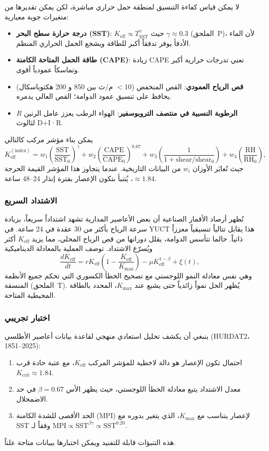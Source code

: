 \documentclass[11pt,a4paper]{article}
\newcommand{\Keff}{K_{\mathrm{eff}}}
\begin{document}
	لا يمكن قياس كفاءة التنسيق لمنطقة حمل حراري مباشرة، لكن يمكن تقديرها من متغيرات جوية معيارية:
	\begin{itemize}
		\item \textbf{درجة حرارة سطح البحر (SST)}: \(K_{\mathrm{eff}} \propto T_{\mathrm{SST}}^{\gamma}\) حيث \(\gamma \approx 0.3\) (الملحق~P)، لأن الماء الأدفأ يوفر تدفقاً أكبر للطاقة ويشجع الحمل الحراري المنظم.
		\item \textbf{طاقة الحمل المتاحة الكامنة (CAPE)}: زيادة CAPE تعني تدرجات حرارية أكبر وتماسكاً عمودياً أقوى.
		\item \textbf{قص الرياح العمودي}: القص المنخفض (\(< 10\) م/ث بين 850 و 200 هكتوباسكال) يحافظ على تنسيق عمود الدوامة؛ القص العالي يدمره.
		\item \textbf{الرطوبة النسبية في منتصف التروبوسفير}: الهواء الرطب يعزز عامل الرنين \(R\) لثالوث D+I·R.
	\end{itemize}
	يمكن بناء مؤشر مركب كالتالي
	\[
	\Keff^{\mathrm{(index)}} = w_1 \left( \frac{\mathrm{SST}}{\mathrm{SST}_0} \right)^{\gamma}
	+ w_2 \left( \frac{\mathrm{CAPE}}{\mathrm{CAPE}_0} \right)^{0.67}
	+ w_3 \left( \frac{1}{1 + \mathrm{shear}/\mathrm{shear}_0} \right)
	+ w_4 \left( \frac{\mathrm{RH}}{\mathrm{RH}_0} \right),
	\]
	حيث تُعايَر الأوزان \(w_i\) من البيانات التاريخية. عندما يتجاوز هذا المؤشر القيمة الحرجة \(\approx 1.84\)، يُتنبأ بتكون الإعصار بفترة إنذار 24--48 ساعة.
	
	\subsubsection*{الاشتداد السريع}
	
	تُظهر أرصاد الأقمار الصناعية أن بعض الأعاصير المدارية تشهد اشتداداً سريعاً، بزيادة سرعة الرياح بأكثر من 30 عقدة في 24 ساعة. في YUCT هذا يقابل تتالياً تنسيقياً معززاً ذاتياً. حالما تتأسس الدوامة، يقلل دورانها من قص الرياح المحلي، مما يزيد \(\Keff\) أكثر ويُسرّع الاشتداد. توصف العملية بالمعادلة الديناميكية
	\[
	\frac{d\Keff}{dt} = r \Keff \left( 1 - \frac{\Keff}{K_{\max}} \right)
	- \mu \Keff^{1-\beta} + \xi(t),
	\]
	وهي نفس معادلة النمو اللوجستي مع تصحيح الخطأ الكسوري التي تحكم جميع الأنظمة المنسقة (الملحق~T). يُظهر الحل نمواً زائدياً حتى يشبع عند \(K_{\max}\)، المحدد بالطاقة المحيطية المتاحة.
	
	\subsubsection*{اختبار تجريبي}
	
	ينبغي أن يكشف تحليل استعادي منهجي لقاعدة بيانات أعاصير الأطلسي (HURDAT2، 1851--2025):
	\begin{enumerate}
		\item احتمال تكون الإعصار هو دالة لاخطية للمؤشر المركب \(\Keff\)، مع عتبة حادة قرب \(K_{\mathrm{crit}} \approx 1.84\).
		\item معدل الاشتداد يتبع معادلة الخطأ اللوجستي، حيث يظهر الأس \(\beta = 0.67\) في حد الاضمحلال.
		\item الحد الأقصى للشدة الكامنة (MPI) لإعصار يتناسب مع \(K_{\max}\)، الذي يتغير بدوره مع SST وفقاً لـ \(\mathrm{MPI} \propto \mathrm{SST}^{\beta\gamma} \propto \mathrm{SST}^{0.20}\).
	\end{enumerate}
	هذه التنبؤات قابلة للتفنيد ويمكن اختبارها ببيانات متاحة علناً.
	
\end{document}
